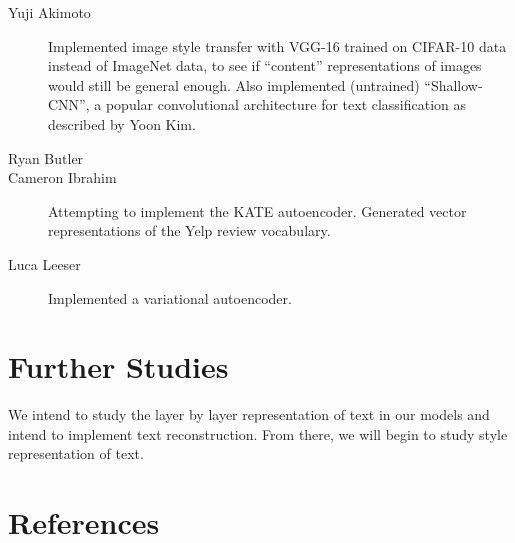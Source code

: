 \documentclass{article}
\begin{document}
\begin{description}

	\item [Yuji Akimoto]
		Implemented image style transfer with VGG-16 trained on CIFAR-10 data instead of ImageNet data, to see if ``content'' representations of images would still be general enough. Also implemented (untrained) ``Shallow-CNN'', a popular convolutional architecture for text classification as described by Yoon Kim.

	\item [Ryan Butler]

	\item [Cameron Ibrahim]
		Attempting to implement the KATE autoencoder.
		Generated vector representations of the Yelp review vocabulary. 

	\item [Luca Leeser]
		Implemented a variational autoencoder.

\end{description}

\section{Further Studies}

We intend to study the layer by layer representation of text in our models and intend to implement text reconstruction. From there, we will begin to study style representation of text.

\section{References}
\end{document}

